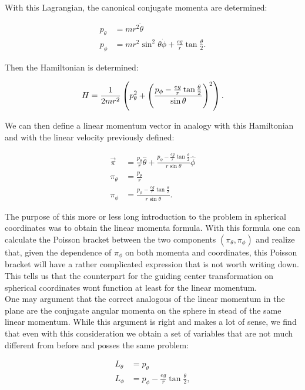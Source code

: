 With this Lagrangian, the canonical conjugate momenta are determined:

\begin{align*}
p_\theta &= mr^2\dot{\theta}\\
p_\phi &= mr^2\sin^2\theta\dot{\phi} + \frac{eg}{r}\tan{\frac{\theta}{2}}.
\end{align*}

Then the Hamiltonian is determined:

\begin{equation}
H = \frac{1}{2mr^2}\left( p_\theta^2 + \left( \frac{p_\phi - \frac{eg}{r}\tan{\frac{\theta}{2}}}{\sin\theta} \right)^2 \right).
\end{equation}

We can then define a linear momentum vector in analogy with this Hamiltonian and with the linear velocity previously defined:

\begin{align*}
\vec{\pi} &= \frac{p_\theta}{r}\hat{\theta} + \frac{p_\phi - \frac{eg}{r}\tan{\frac{\theta}{2}}}{r\sin\theta}\hat{\phi}\\
\pi_\theta &= \frac{p_\theta}{r}\\
\pi_\phi &= \frac{p_\phi - \frac{eg}{r}\tan{\frac{\theta}{2}}}{r\sin\theta}.
\end{align*}

The purpose of this more or less long introduction to the problem in spherical coordinates was to obtain the linear momenta formula. With this formula one can calculate the Poisson bracket between the two components $(\pi_\theta,\pi_\phi)$ and realize that, given the dependence of $\pi_\phi$ on both momenta and coordinates, this Poisson bracket will have a rather complicated expression that is not worth writing down. This tells us that the counterpart for the guiding center transformation on spherical coordinates wont function at least for the linear momentum. \\

One may argument that the correct analogous of the linear momentum in the plane are the conjugate angular momenta on the sphere in stead of the same linear momentum. While this argument is right and makes a lot of sense, we find that even with this consideration we obtain a set of variables that are not much different from before and posses the same problem:

\begin{align*}
L_\theta &= p_\theta\\
L_\phi &= p_\phi - \frac{eg}{r}\tan{\frac{\theta}{2}},
\end{align*}

